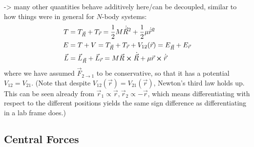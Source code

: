 \documentclass[../class_mech_main.tex]{subfiles}
\begin{document}
-> many other quantities behave additively here/can be decoupled, similar to how things were in general for $N$-body systems:
\begin{subequations}
	\begin{align}
		T &= T_{\vec{R}} + T_{\vec{r}} = \frac{1}{2} M \dot{\vec{R}}^2 + \frac{1}{2} \mu \dot{\vec{r}}^2
		\\
		E &= T + V = T_{\vec{R}} + T_{\vec{r}} + V_{12}(\vec{r}) = E_{\vec{R}} + E_{\vec{r}}
		\\
		\vec{L} &= \vec{L}_{\vec{R}} + \vec{L}_{\vec{r}} = M \vec{R} \cross \dot{\vec{R}} + \mu \vec{r} \cross \dot{\vec{r}}
	\end{align}
\end{subequations}
where we have assumed $\vec{F}_{2 \rightarrow 1}$ to be conservative, so that it has a potential $V_{12} = V_{21}$. (Note that despite $V_{12}(\vec{r}) = V_{21}(\vec{r})$, Newton's third law holds up. This can be seen already from $\vec{r}_1 \propto \vec{r}, \vec{r}_2 \propto -\vec{r}$, which means differentiating with respect to the different positions yields the same sign difference as differentiating in a lab frame does.)











	    \subsection{Central Forces}
		\label{sec:central_force}
\end{document}
